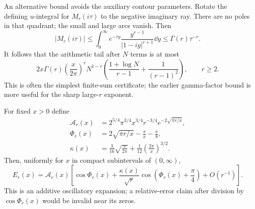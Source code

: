 An alternative bound avoids the auxiliary contour parameters.
Rotate the defining \(u\)-integral for \(M_r(i\tau)\) to the negative
imaginary ray. There are no poles in that quadrant; the small and
large arcs vanish. Then
\[
 |M_r(i\tau)|
 \leq\int_0^\infty e^{-\tau y}
       \frac{y^{r-1}}{|1-iy|^{r+1}}\dd y
 \leq\Gamma(r)\tau^{-r}.
\]
It follows that the arithmetic tail after \(N\) terms is at most
\begin{equation}\label{hergjet:eq:herglotz-simple-tail}
 2x\Gamma(r)\left(\frac{x}{2\pi}\right)^r N^{1-r}
 \left(\frac{1+\log N}{r-1}+\frac1{(r-1)^2}\right),
 \qquad r\geq2.
\end{equation}
This is often the simplest finite-sum certificate; the earlier
gamma-factor bound is more useful for the sharp large-\(r\) exponent.

\begin{theorem}\label{hergjet:thm:herglotz-oscillation}
For fixed $x>0$ define
\begin{align*}
 \mathcal A_r(x)&=
 2^{5/4}\pi^{3/4}x^{3/4}r^{-3/4}
       e^{-2\sqrt{\pi r/x}},\\
 \Phi_r(x)&=2\sqrt{\pi r/x}-\frac\pi x-\frac\pi8,\\
 \kappa(x)&=\frac3{16}\sqrt{\frac{x}{2\pi}}
             +\frac1{12}\left(\frac{2\pi}{x}\right)^{3/2}.
\end{align*}
Then, uniformly for $x$ in compact subintervals of $(0,\infty)$,
\[
 E_r(x)=\mathcal A_r(x)
 \left[\cos\Phi_r(x)+\frac{\kappa(x)}{\sqrt r}
          \cos\left(\Phi_r(x)+\frac\pi4\right)
          +O(r^{-1})\right].
\]
This is an additive oscillatory expansion; a relative-error claim after
division by $\cos\Phi_r(x)$ would be invalid near its zeros.
\end{theorem}

